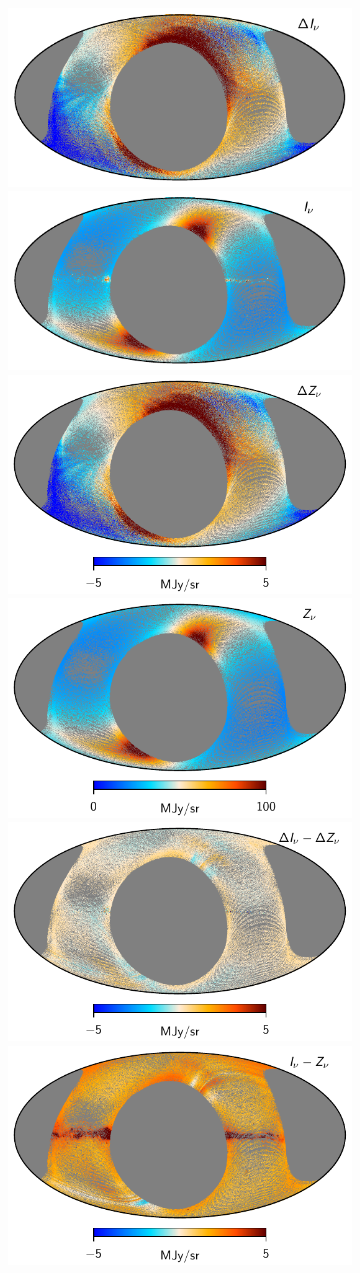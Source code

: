 \documentclass{aa}
\begin{document}
\begin{figure}
\begin{figure}
    \centering
    \includegraphics[width=0.49\linewidth]{figs/maptot_06a_week_minus_full.pdf}
    \includegraphics[width=0.49\linewidth]{figs/maptot_06a_week.pdf}\\
    \includegraphics[width=0.49\linewidth]{figs/mapzodi_06a_week_minus_full.pdf}
    \includegraphics[width=0.49\linewidth]{figs/mapzodi_06a_week.pdf}
    \includegraphics[width=0.49\linewidth]{figs/map_06a_week_minus_full.pdf}
    \includegraphics[width=0.49\linewidth]{figs/map_06a_week.pdf}

\end{figure}
\end{figure}
\end{document}

